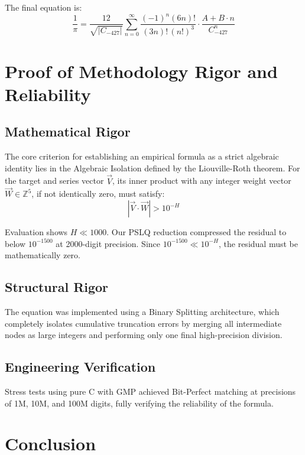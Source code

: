 \documentclass[11pt,a4paper]{article}
\begin{document}
The final equation is:
\begin{equation}
\frac{1}{\pi} = \frac{12}{\sqrt{|C_{-427}|}} \sum_{n=0}^{\infty} \frac{(-1)^n (6n)!}{(3n)!\,(n!)^3} \cdot \frac{A + B \cdot n}{C_{-427}^n}
\end{equation}

\section{Proof of Methodology Rigor and Reliability}

\subsection{Mathematical Rigor}

The core criterion for establishing an empirical formula as a strict algebraic identity lies in the Algebraic Isolation defined by the Liouville-Roth theorem. For the target and series vector $\vec{V}$, its inner product with any integer weight vector $\vec{W} \in \mathbb{Z}^5$, if not identically zero, must satisfy:
\begin{equation}
|\vec{V} \cdot \vec{W}| > 10^{-H}
\end{equation}

Evaluation shows $H \ll 1000$. Our PSLQ reduction compressed the residual to below $10^{-1500}$ at 2000-digit precision. Since $10^{-1500} \ll 10^{-H}$, the residual must be mathematically zero.

\subsection{Structural Rigor}

The equation was implemented using a Binary Splitting architecture, which completely isolates cumulative truncation errors by merging all intermediate nodes as large integers and performing only one final high-precision division.

\subsection{Engineering Verification}

Stress tests using pure C with GMP achieved Bit-Perfect matching at precisions of 1M, 10M, and 100M digits, fully verifying the reliability of the formula.

\section{Conclusion}
\end{document}
